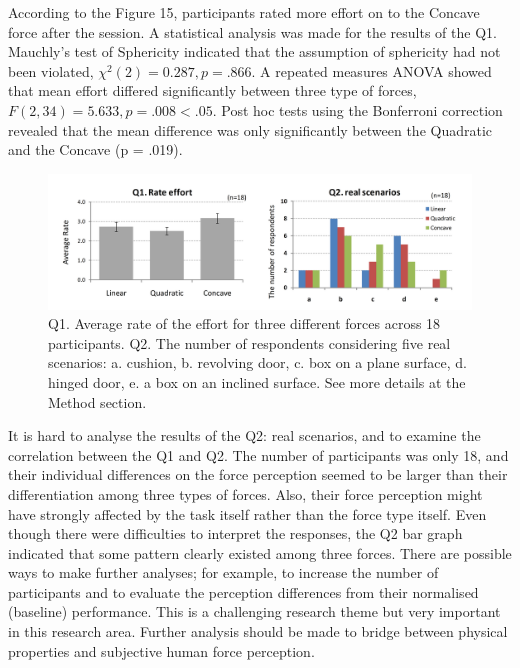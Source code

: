According to the Figure 15, participants rated more effort on to the Concave force after the session.
A statistical analysis was made for the results of the Q1. Mauchly’s test of Sphericity indicated that the assumption of sphericity had not been violated, $χ^2 (2) = 0.287, p = .866$. A repeated measures ANOVA showed that mean effort differed significantly between three type of forces,$ F(2,34) = 5.633, p = .008 < .05$. Post hoc tests using the Bonferroni correction revealed that the mean difference was only significantly between the Quadratic and the Concave (p = .019).
%
\begin{figure}
  \centering
  \includegraphics[scale=0.5]{Chie/figs/Figure15.png}
  \caption{Q1. Average rate of the effort for three different forces across 18 participants. Q2. The number of respondents considering five real scenarios: a. cushion, b. revolving door, c. box on a plane surface, d. hinged door, e. a box on an inclined surface.  See more details at the Method section. }
  \label{questionnaire}
\end{figure}
It is hard to analyse the results of the Q2: real scenarios, and to examine the correlation between the Q1 and Q2. The number of participants was only 18, and their individual differences on the force perception seemed to be larger than their differentiation among three types of forces. Also, their force perception might have strongly affected by the task itself rather than the force type itself. Even though there were difficulties to interpret the responses, the Q2 bar graph indicated that some pattern clearly existed among three forces. There are possible ways to make further analyses; for example, to increase the number of participants and to evaluate the perception differences from their normalised (baseline) performance. This is a challenging research theme but very important in this research area. Further analysis should be made to bridge between physical properties and subjective human force perception.







